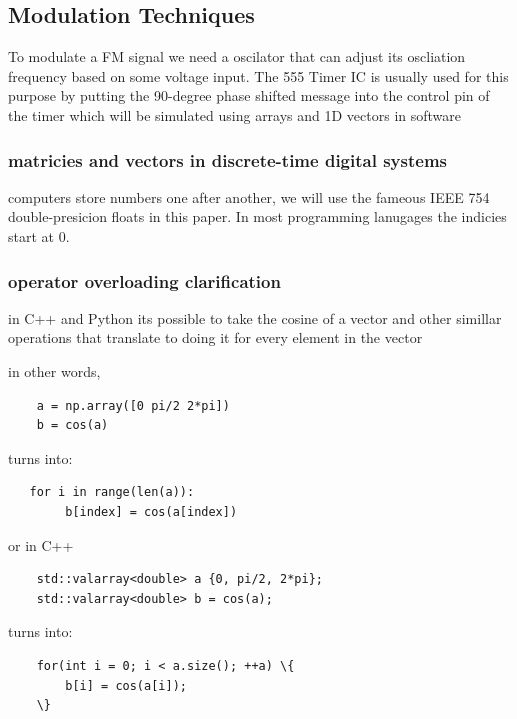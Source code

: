 \documentclass[conference]{IEEEtran}
\begin{document}
\subsection{Modulation Techniques}

To modulate a FM signal we need a oscilator that can adjust its oscliation frequency based on some voltage input. The 555 Timer IC is usually used for this purpose by putting the 90-degree phase shifted message into the control pin of the timer which will be simulated using arrays and 1D vectors in software

\subsubsection{matricies and vectors in discrete-time digital systems}

computers store numbers one after another, we will use the fameous IEEE 754 double-presicion floats in this paper. In most programming lanugages the indicies start at 0.

\subsubsection{operator overloading clarification}

in C++ and Python its possible to take the cosine of a vector and other simillar operations that translate to doing it for every element in the vector

in other words,

\begin{lstlisting}
    a = np.array([0 pi/2 2*pi])
    b = cos(a)
\end{lstlisting}


turns into:

\begin{lstlisting}
   for i in range(len(a)):
        b[index] = cos(a[index])
\end{lstlisting}


or in C++


\begin{lstlisting}
    std::valarray<double> a {0, pi/2, 2*pi};
    std::valarray<double> b = cos(a);
\end{lstlisting}

turns into:

\begin{lstlisting}
    for(int i = 0; i < a.size(); ++a) \{
        b[i] = cos(a[i]);
    \}
\end{lstlisting}
\end{document}
